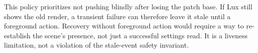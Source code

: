 \documentclass[a4paper,10pt,fleqn]{article}
\begin{document}
This policy prioritizes not pushing blindly after losing the patch
base. If Lux still shows the old render, a transient failure can
therefore leave it stale until a foreground action. Recovery without
foreground action would require a way to re-establish the scene's
presence, not just a successful settings read. It is a liveness
limitation, not a violation of the stale-event safety invariant.
\end{document}
